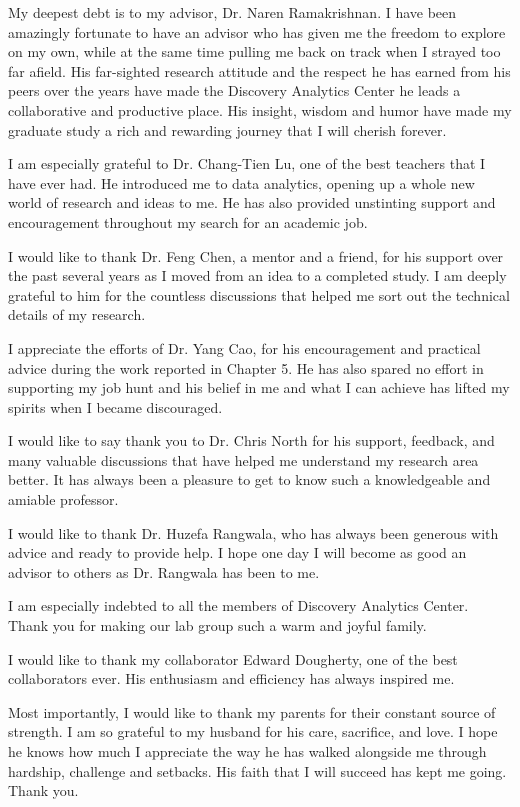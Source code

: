 \documentclass[12pt,dvips]{report}
\begin{document}
My deepest debt is to my advisor, Dr. Naren Ramakrishnan. I have been amazingly fortunate to have an advisor who has given me the freedom to explore on my own, while at the same time pulling me back on track when I strayed too far afield. His far-sighted research attitude and the respect he has earned from his peers over the years have made the Discovery Analytics Center he leads a collaborative and productive place. His insight, wisdom and humor have made my graduate study a rich and rewarding journey that I will cherish forever.

I am especially grateful to Dr. Chang-Tien Lu, one of the best teachers that I have ever had. He introduced me to data analytics, opening up a whole new world of research and ideas to me. He has also provided unstinting support and encouragement throughout my search for an academic job.

I would like to thank Dr. Feng Chen, a mentor and a friend, for his support over the past several years as I moved from an idea to a completed study. I am deeply grateful to him for the countless discussions that helped me sort out the technical details of my research.

I appreciate the efforts of Dr. Yang Cao, for his encouragement and practical advice during the work reported in Chapter 5. He has also spared no effort in supporting my job hunt and his belief in me and what I can achieve has lifted my spirits when I became discouraged.

I would like to say thank you to Dr. Chris North for his support, feedback, and many valuable discussions that have helped me understand my research area better. It has always been a pleasure to get to know such a knowledgeable and amiable professor.

I would like to thank Dr. Huzefa Rangwala, who has always been generous with advice and ready to provide help. I hope one day I will become as good an advisor to others as Dr. Rangwala has been to me.

I am especially indebted to all the members of Discovery Analytics Center. Thank you for making our lab group such a warm and joyful family.

I would like to thank my collaborator Edward Dougherty, one of the best collaborators ever. His enthusiasm and efficiency has always inspired me.

Most importantly, I would like to thank my parents for their constant source of strength. I am so grateful to my husband for his care, sacrifice, and love. I hope he knows how much I appreciate the way he has walked alongside me through hardship, challenge and setbacks. His faith that I will succeed has kept me going. Thank you.
\end{document}
